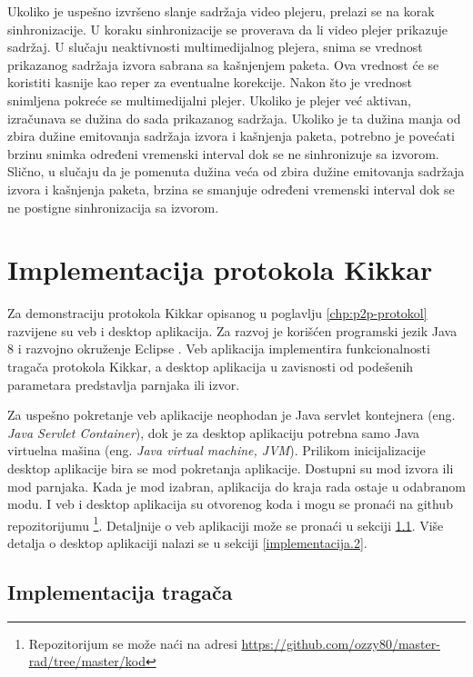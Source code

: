 \documentclass[12pt,oneside]{memoir}
\begin{document}
Ukoliko je uspešno izvršeno slanje sadržaja video plejeru, prelazi se na korak sinhronizacije. U koraku sinhronizacije se proverava da li video plejer prikazuje sadržaj. U slučaju neaktivnosti multimedijalnog plejera, snima se vrednost prikazanog sadržaja izvora sabrana sa kašnjenjem paketa. Ova vrednost će se koristiti kasnije kao reper za eventualne korekcije. Nakon što je vrednost snimljena pokreće se multimedijalni plejer. Ukoliko je plejer već aktivan, izračunava se dužina do sada prikazanog sadržaja. Ukoliko je ta dužina manja od zbira dužine emitovanja sadržaja izvora i kašnjenja paketa, potrebno je povećati brzinu snimka određeni vremenski interval dok se ne sinhronizuje sa izvorom. Slično, u slučaju da je pomenuta dužina veća od zbira dužine emitovanja sadržaja izvora i kašnjenja paketa, brzina se smanjuje određeni vremenski interval dok se ne postigne sinhronizacija sa izvorom. 


\chapter{Implementacija protokola Kikkar}
\label{chp:p2p-implementacija}

Za demonstraciju protokola Kikkar opisanog u poglavlju \ref{chp:p2p-protokol} razvijene su veb i desktop aplikacija. Za razvoj je korišćen programski jezik Java 8 \cite{Java} i razvojno okruženje Eclipse \cite{Eclipse}. Veb aplikacija implementira funkcionalnosti tragača protokola Kikkar, a desktop aplikacija u zavisnosti od podešenih parametara predstavlja parnjaka ili izvor. 

Za uspešno pokretanje veb aplikacije neophodan je Java servlet kontejnera (eng. \textit{Java Servlet Container}), dok je za desktop aplikaciju potrebna samo Java virtuelna mašina (eng. \textit{Java virtual machine, JVM}). Prilikom inicijalizacije desktop aplikacije bira se mod pokretanja aplikacije. Dostupni su mod izvora ili mod parnjaka. Kada je mod izabran, aplikacija do kraja rada ostaje u odabranom modu. I veb i desktop aplikacija su otvorenog koda i mogu se pronaći na github repozitorijumu \footnote{Repozitorijum se može naći na adresi \url{https://github.com/ozzy80/master-rad/tree/master/kod}}. Detaljnije o veb aplikaciji može se pronaći u sekciji \ref{implementacija.1}. Više detalja o desktop aplikaciji nalazi se u sekciji \ref{implementacija.2}.

\section{Implementacija tragača}
\label{implementacija.1}
\end{document}
